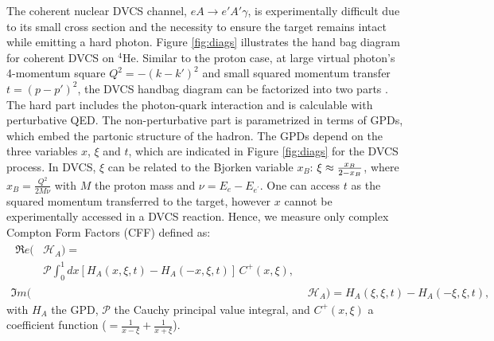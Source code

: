 \documentclass[preprint,nofootinbib,showpacs,prl,superscriptaddress,secnumarabic,amssymb,nobibnotes,aps,floatfix]{revtex4}
\begin{document}
The coherent nuclear DVCS channel, $eA \rightarrow e' A' \gamma$, is 
experimentally difficult due to  its small cross section and the necessity to 
ensure the target remains intact while emitting a hard photon.  Figure 
\ref{fig:diags} illustrates the hand bag diagram for coherent DVCS on $^4$He.  
Similar to the proton case, at large virtual photon's 4-momentum square 
$Q^2=-(k-k')^{2}$ and small squared momentum transfer $t=(p-p')^{2}$,
the DVCS handbag diagram can be factorized into two parts 
\cite{Freund_Collins,Ji_Osborne}. The hard part includes the photon-quark 
interaction and is calculable with perturbative QED.  The non-perturbative 
part is parametrized in terms of GPDs, which embed the partonic structure of 
the hadron. The GPDs depend on the three variables $x$, $\xi$ and $t$, which are 
indicated in Figure \ref{fig:diags} for the DVCS process. In DVCS, $\xi$ can 
be related to the Bjorken variable $x_{B}$: $\xi\approx {{x_B}\over{2-x_B}}$, 
where $x_B=\frac{Q^2}{2M\nu}$ with $M$ the proton mass and 
$\nu=E_e-E_{e^\prime}$. One can access $t$ as the squared momentum 
transferred to the target, however $x$ cannot be experimentally 
accessed in a DVCS reaction. Hence, we measure only complex Compton Form 
Factors (CFF) \cite{Guidal:2013rya} defined as:
\begin{align}
\begin{split}
\Re e(&\mathcal{H}_{A}) = \\
    &\mathcal{P} 
\int_{0}^{1}dx[H_A(x,\xi,t)-H_A(-x,\xi,t)] \, C^{+}(x,\xi), 
\end{split} \\
\Im m(&\mathcal{H}_{A}) = H_A(\xi,\xi,t)-H_A(-\xi,\xi,t),
\end{align}
with $H_A$ the GPD, $\mathcal{P}$ 
the Cauchy principal value integral, and $C^{+}(x,\xi)$ a coefficient function 
($=  \frac{1}{x-\xi} + \frac{1}{x+\xi}$).
\end{document}
